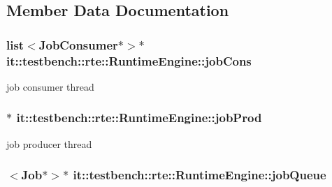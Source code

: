 \subsection{Member Data Documentation}
\hypertarget{classit_1_1testbench_1_1rte_1_1RuntimeEngine_a646520c7c1673cd9ddc86a27c19f161f}{
\subsubsection[{job\-Cons}]{\setlength{\rightskip}{0pt plus 5cm}list$<${\bf Job\-Consumer}$\ast$$>$$\ast$ it\-::testbench\-::rte\-::\-Runtime\-Engine\-::job\-Cons\hspace{0.3cm}{\ttfamily [private]}}}\label{d9/d54/classit_1_1testbench_1_1rte_1_1RuntimeEngine_a646520c7c1673cd9ddc86a27c19f161f}
job consumer thread \hypertarget{classit_1_1testbench_1_1rte_1_1RuntimeEngine_a4b4fdfac0c22969d1041c0a7b6cb11dc}{
\subsubsection[{job\-Prod}]{$\ast$ it\-::testbench\-::rte\-::\-Runtime\-Engine\-::job\-Prod\hspace{0.3cm}{\ttfamily [private]}}}\label{d9/d54/classit_1_1testbench_1_1rte_1_1RuntimeEngine_a4b4fdfac0c22969d1041c0a7b6cb11dc}
job producer thread \hypertarget{classit_1_1testbench_1_1rte_1_1RuntimeEngine_ad56ac5fbd42f255b23c1cac3104c454a}{
\subsubsection[{job\-Queue}]{$<${\bf Job}$\ast$$>$$\ast$ it\-::testbench\-::rte\-::\-Runtime\-Engine\-::job\-Queue\hspace{0.3cm}{\ttfamily [private]}}}\label{d9/d54/classit_1_1testbench_1_1rte_1_1RuntimeEngine_ad56ac5fbd42f255b23c1cac3104c454a}
